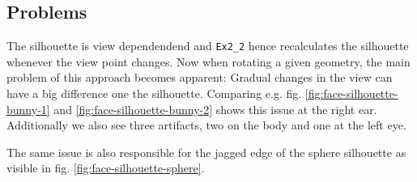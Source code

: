 \documentclass[a4paper,10pt,notitlepage]{scrreprt}
\begin{document}
\subsection{Problems}

The silhouette is view dependendend and \texttt{Ex2\_2} hence recalculates the
silhouette whenever the view point changes. Now when rotating a given geometry,
the main problem of this approach becomes apparent: Gradual changes in the view
can have a big difference one the silhouette. Comparing e.g. fig.
\ref{fig:face-silhouette-bunny-1} and \ref{fig:face-silhouette-bunny-2} shows
this issue at the right ear. Additionally we also see three artifacts, two on
the body and one at the left eye.

The same issue is also responsible for the jagged edge of the sphere silhouette
as visible in fig. \ref{fig:face-silhouette-sphere}. 
\end{document}
